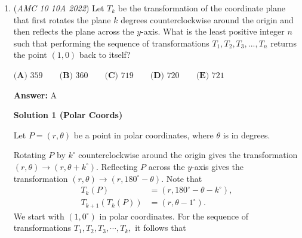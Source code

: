 \begin{enumerate}
 Clearly, the $9$ ordered triples $(a,b,c)=(1,1,1),(2,2,2),\ldots,(9,9,9)$ are solutions to this equation.

 The expression $3b+4c$ has the same value when:

 
            \begin{itemize}
        \item $b$ increases by $4$ as $c$ decreases by $3.$
            \end{itemize}
            
            \begin{itemize}
        \item $b$ decreases by $4$ as $c$ increases by $3.$
            \end{itemize}
            We find $4$ more solutions from the $9$ solutions above: $(a,b,c)=(4,8,1),(5,1,8),(5,9,2),(6,2,9).$ Note that all solutions are symmetric about $(a,b,c)=(5,5,5).$

 Together, we have $9+4=\boxed{\textbf{(D) } 13}$ ordered triples $(a,b,c).$

 \textbf{Remark} One way to solve the Diophantine Equation, $7a=3b+4c$ is by taking $\pmod{7}$, from which the equation becomes $0\equiv 3b-3c\pmod{7} \Longrightarrow b\equiv c\pmod{7}$ so either $b=c$ or WLOG $b<c, b+7=c$.

 


	\item (\textit{AMC 10 10A 2022}) Let $T_k$ be the transformation of the coordinate plane that first rotates the plane $k$ degrees counterclockwise around the origin and then reflects the plane across the $y$-axis. What is the least positive integer $n$ such that performing the sequence of transformations $T_1, T_2, T_3,...,T_n$ returns the point $(1, 0)$ back to itself?


 $\textbf{(A) } 359 \qquad \textbf{(B) } 360 \qquad \textbf{(C) } 719 \qquad \textbf{(D) } 720 \qquad \textbf{(E) } 721$

 \textbf{Answer: }A



\textbf{Solution 1 (Polar Coords)}

Let $P=(r,\theta)$ be a point in polar coordinates, where $\theta$ is in degrees.

 Rotating $P$ by $k^{\circ}$ counterclockwise around the origin gives the transformation $(r,\theta)\rightarrow(r,\theta+k^{\circ}).$ Reflecting $P$ across the $y$-axis gives the transformation $(r,\theta)\rightarrow(r,180^{\circ}-\theta).$ Note that 
 \begin{align*} T_k(P)&=(r,180^{\circ}-\theta-k^{\circ}), \\ T_{k+1}(T_k(P)) &= (r,\theta -1^{\circ}). \end{align*}
We start with $(1,0^{\circ})$ in polar coordinates. For the sequence of transformations $T_1, T_2, T_3, \cdots, T_k,$ it follows that


\end{enumerate}
